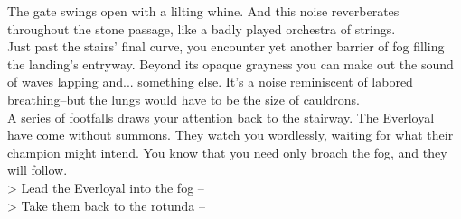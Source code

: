 The gate swings open with a lilting whine. And this noise reverberates throughout the stone passage, like a badly played orchestra of strings.\\

Just past the stairs' final curve, you encounter yet another barrier of fog filling the landing's entryway. Beyond its opaque grayness you can make out the sound of waves lapping and... something else. It's a noise reminiscent of labored breathing--but the lungs would have to be the size of cauldrons.\\

A series of footfalls draws your attention back to the stairway. The Everloyal have come without summons. They watch you wordlessly, waiting for what their champion might intend. You know that you need only broach the fog, and they will follow.\\

> Lead the Everloyal into the fog -- \\
> Take them back to the rotunda -- 